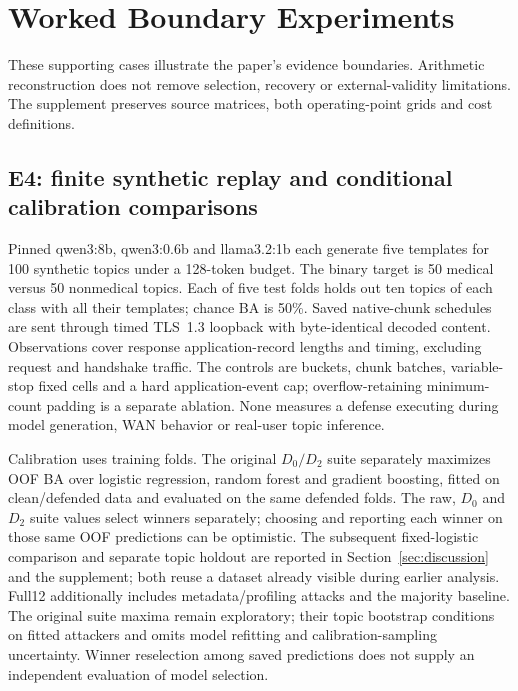 \section{Worked Boundary Experiments}\label{app:boundary-experiments}
These supporting cases illustrate the paper's evidence boundaries. Arithmetic reconstruction does not remove selection, recovery or external-validity limitations. The supplement preserves source matrices, both operating-point grids and cost definitions.




\subsection{E4: finite synthetic replay and conditional calibration comparisons}
Pinned qwen3:8b, qwen3:0.6b and llama3.2:1b each generate five templates for 100 synthetic topics under a 128-token budget. The binary target is 50 medical versus 50 nonmedical topics. Each of five test folds holds out ten topics of each class with all their templates; chance BA is 50\%. Saved native-chunk schedules are sent through timed TLS~1.3 loopback with byte-identical decoded content. Observations cover response application-record lengths and timing, excluding request and handshake traffic. The controls are buckets, chunk batches, variable-stop fixed cells and a hard application-event cap; overflow-retaining minimum-count padding is a separate ablation. None measures a defense executing during model generation, WAN behavior or real-user topic inference.

Calibration uses training folds. The original $D_0/D_2$ suite separately maximizes OOF BA over logistic regression, random forest and gradient boosting, fitted on clean/defended data and evaluated on the same defended folds. The raw, $D_0$ and $D_2$ suite values select winners separately; choosing and reporting each winner on those same OOF predictions can be optimistic. The subsequent fixed-logistic comparison and separate topic holdout are reported in Section~\ref{sec:discussion} and the supplement; both reuse a dataset already visible during earlier analysis. Full12 additionally includes metadata/profiling attacks and the majority baseline. The original suite maxima remain exploratory; their topic bootstrap conditions on fitted attackers and omits model refitting and calibration-sampling uncertainty. Winner reselection among saved predictions does not supply an independent evaluation of model selection.

